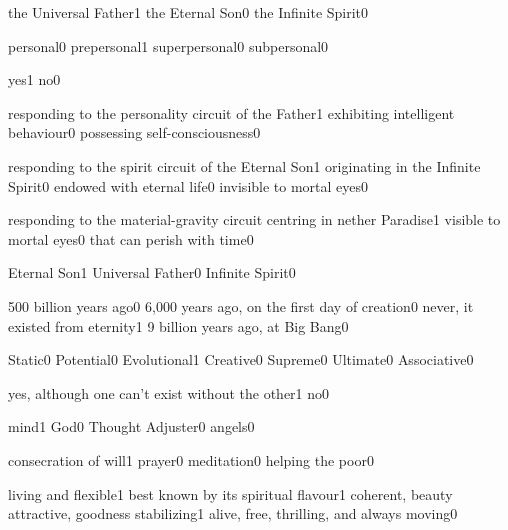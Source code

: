 {the Universal Father}{1}
{the Eternal Son}{0}
{the Infinite Spirit}{0}
\qstop

{personal}{0}
{prepersonal}{1}
{superpersonal}{0}
{subpersonal}{0}
\qstop

{yes}{1}
{no}{0}
\qstop

{responding to the personality circuit of the Father}{1}
{exhibiting intelligent behaviour}{0}
{possessing self-consciousness}{0}
\qstop

{responding to the spirit circuit of the Eternal Son}{1}
{originating in the Infinite Spirit}{0}
{endowed with eternal life}{0}
{invisible to mortal eyes}{0}
\qstop

{responding to the material-gravity circuit centring in nether Paradise}{1}
{visible to mortal eyes}{0}
{that can perish with time}{0}
\qstop

{Eternal Son}{1}
{Universal Father}{0}
{Infinite Spirit}{0}
\qstop

{500 billion years ago}{0}
{6,000 years ago, on the first day of creation}{0}
{never, it existed from eternity}{1}
{9 billion years ago, at Big Bang}{0}
\qstop

{Static}{0}
{Potential}{0}
{Evolutional}{1}
{Creative}{0}
{Supreme}{0}
{Ultimate}{0}
{Associative}{0}
\qstop

{yes, although one can't exist without the other}{1}
{no}{0}
\qstop

{mind}{1}
{God}{0}
{Thought Adjuster}{0}
{angels}{0}
\qstop


{consecration of will}{1}
{prayer}{0}
{meditation}{0}
{helping the poor}{0}
\qstop


{living and flexible}{1}
{best known by its spiritual flavour}{1}
{coherent, beauty attractive, goodness stabilizing}{1}
{alive, free, thrilling, and always moving}{0}
\qstop

